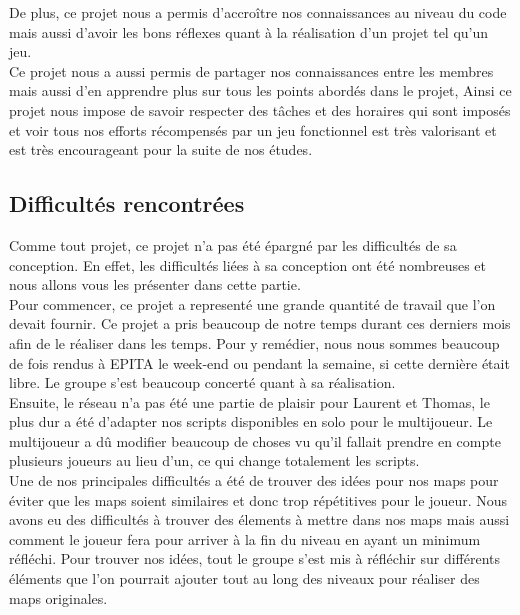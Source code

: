 \documentclass[a4paper , 12pt]{article}
\begin{document}
De plus, ce projet nous a permis d’accroître nos connaissances au niveau du code mais aussi d’avoir les bons réflexes quant à la réalisation d’un projet tel qu’un jeu.\\

Ce projet nous a aussi permis de partager nos connaissances entre les membres mais aussi d’en apprendre plus sur tous les points abordés dans le projet, Ainsi ce projet nous impose de savoir respecter des tâches et des horaires qui sont imposés et voir tous nos efforts récompensés par un jeu fonctionnel est très valorisant et est très encourageant pour la suite de nos études.


	\quad

\newpage

	\subsection{Difficultés rencontrées}

\quad
Comme tout projet, ce projet n’a pas été épargné par les difficultés de sa conception. En effet, les difficultés liées à sa conception ont été nombreuses et nous allons vous les présenter dans cette partie.\\

Pour commencer, ce projet a representé une grande quantité de travail que l’on devait fournir. Ce projet a pris beaucoup de notre temps durant ces derniers mois afin de le réaliser dans les temps. Pour y remédier, nous nous sommes beaucoup de fois rendus à EPITA le week-end ou pendant la semaine, si cette dernière était libre. Le groupe s’est beaucoup concerté quant à sa réalisation.\\

Ensuite, le réseau n’a pas été une partie de plaisir pour Laurent et Thomas, le plus dur a été d’adapter nos scripts disponibles en solo pour le multijoueur. Le multijoueur a dû modifier beaucoup de choses vu qu’il fallait prendre en compte plusieurs joueurs au lieu d’un, ce qui change totalement les scripts.\\

Une de nos principales difficultés a été de trouver des idées pour nos maps pour éviter que les maps soient similaires et donc trop répétitives pour le joueur. Nous avons eu des difficultés à trouver des élements à mettre dans nos maps mais aussi comment le joueur fera pour arriver à la fin du niveau en ayant un minimum réfléchi. Pour trouver nos idées, tout le groupe s’est mis à réfléchir sur différents éléments que l’on pourrait ajouter tout au long des niveaux pour réaliser des maps originales.\\
\end{document}
